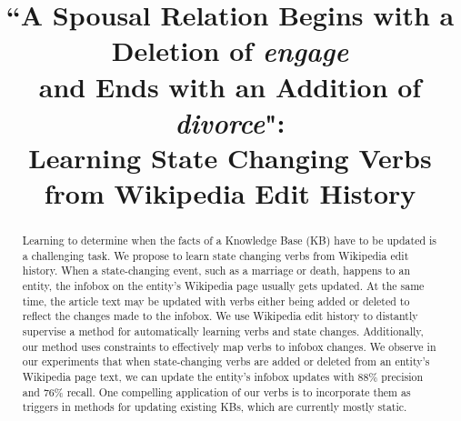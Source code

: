 \documentclass[11pt,a4paper]{article}
\title{``A Spousal Relation Begins with a Deletion of \textit{engage} \\and Ends with an Addition of \textit{divorce}": \\
Learning State Changing Verbs from Wikipedia Edit History}
\author{%
  }
\date{}
\begin{document}
\maketitle


\begin{abstract}


Learning to determine when the facts of a Knowledge Base (KB) have to be updated is a challenging task.
We propose to learn state changing verbs from Wikipedia edit history. When a state-changing event,  such as a marriage or death,  happens to an entity, the  infobox on the entity's Wikipedia page usually gets  updated. At the same time, the  article text may be updated with verbs either being added or deleted to reflect the changes made to the infobox. We use Wikipedia edit history %
to distantly supervise a method for automatically learning verbs and state changes. Additionally, our method uses %
constraints
  to effectively map verbs to infobox changes. We observe in our experiments that when state-changing verbs are  added or deleted from an entity's Wikipedia  page text, we can update the entity's infobox updates with 88\% precision and 76\% recall.
One compelling  application of our verbs is to incorporate them as triggers in methods for   updating existing KBs, which are currently mostly static.

\end{abstract}








\end{document}
